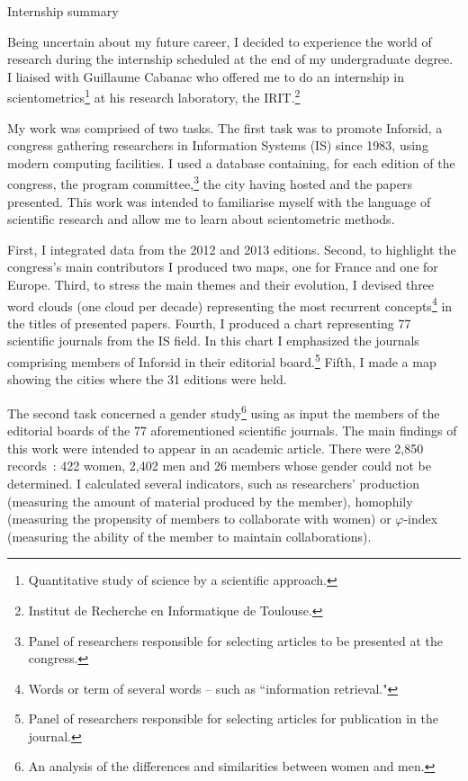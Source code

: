 \cleardoublepage
\begingroup
	\thispagestyle{empty}
	\par\normalfont\sffamily\selectfont
	\noindent\Large{Internship summary}
	\vspace*{5mm}
\endgroup
	
Being uncertain about my future career, I decided to experience the world of research during the internship scheduled at the end of my undergraduate degree. I liaised with Guillaume Cabanac who offered me to do an internship in scientometrics\footnote{Quantitative study of science by a scientific approach.} at his research laboratory, the IRIT.\footnote{Institut de Recherche en Informatique de Toulouse.}


My work was comprised of two tasks. The first task was to promote Inforsid, a congress gathering  researchers in Information Systems (IS) since 1983, using modern computing facilities.  I used a database containing, for each edition of the congress, the program committee,\footnote{Panel of researchers responsible for selecting articles to be presented at the congress.} the city having hosted and the papers presented. This work was intended to familiarise myself with the language of scientific research and allow me to learn about scientometric methods.

First, I integrated data from the 2012 and 2013 editions. Second, to highlight the congress's main contributors I produced two maps, one for France and one for Europe. Third, to stress the main themes and their evolution, I devised three word clouds (one cloud per decade) representing the most recurrent concepts\footnote{Words or term of several words -- such as ``information retrieval."} in the titles of presented papers. Fourth, I produced a chart representing 77 scientific journals from the IS field. In this chart I emphasized the journals comprising members of Inforsid in their editorial board.\footnote{Panel of researchers responsible for selecting articles for publication in the journal.} Fifth, I made a map showing the cities where the 31 editions were held.


The second task concerned a gender study\footnote{An analysis of the differences and similarities between women and men.} using as input the members of the editorial boards of the 77 aforementioned scientific journals. The main findings of this work were intended to appear in an academic article. There were 2,850 records~: 422 women, 2,402 men and 26 members whose gender could not be determined. I calculated several indicators, such as researchers' production (measuring the amount of material produced by the member), homophily (measuring the propensity of members to collaborate with women) or $\varphi$-index (measuring the ability of the member to maintain collaborations).


